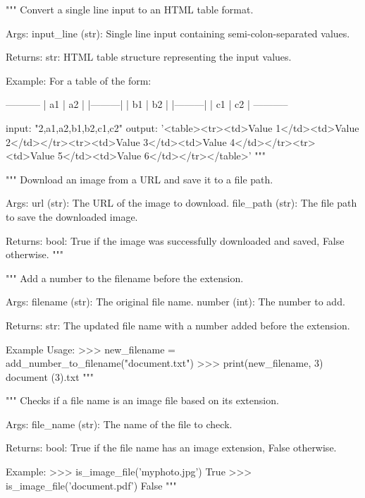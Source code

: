 \begin{codebox}
"""
Convert a single line input to an HTML table format.

Args:
    input_line (str): Single line input containing semi-colon-separated values.

Returns:
    str: HTML table structure representing the input values.

Example:
    For a table of the form:

    -----------
    | a1 | a2 |
    |---------|
    | b1 | b2 |
    |---------|
    | c1 | c2 |
    -----------

    input: "2,a1,a2,b1,b2,c1,c2"
    output: '<table><tr><td>Value 1</td><td>Value 2</td></tr><tr><td>Value 3</td><td>Value 4</td></tr><tr><td>Value 5</td><td>Value 6</td></tr></table>'
"""
\end{codebox}

\begin{codebox}
"""
Download an image from a URL and save it to a file path.

Args:
    url (str): The URL of the image to download.
    file_path (str): The file path to save the downloaded image.

Returns:
    bool: True if the image was successfully downloaded and saved, False otherwise.
"""
\end{codebox}

\begin{codebox}
"""
Add a number to the filename before the extension.

Args:
    filename (str): The original file name.
    number (int): The number to add.

Returns:
    str: The updated file name with a number added before the extension.

Example Usage:
    >>> new_filename = add_number_to_filename("document.txt")
    >>> print(new_filename, 3)
    document (3).txt
"""
\end{codebox}

\begin{codebox}
"""
Checks if a file name is an image file based on its extension.

Args:
    file_name (str): The name of the file to check.

Returns:
    bool: True if the file name has an image extension, False otherwise.

Example:
    >>> is_image_file('myphoto.jpg')
    True
    >>> is_image_file('document.pdf')
    False
"""
\end{codebox}


